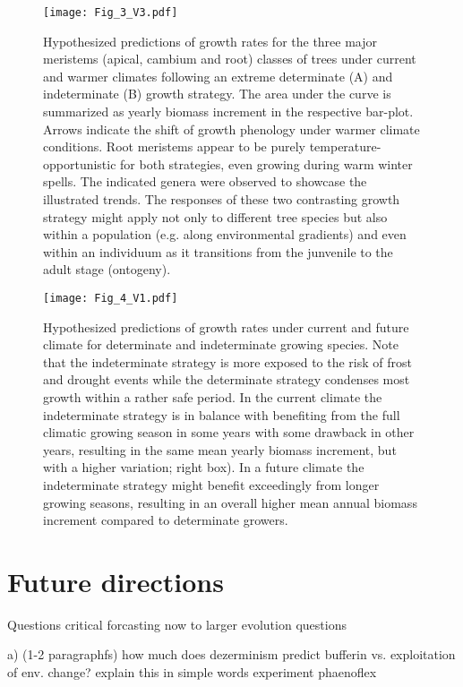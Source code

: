 \documentclass{article}
\begin{document}
								\begin{figure}
								\centering
								\texttt{[image: Fig\_3\_V3.pdf]} 
								\caption{Hypothesized predictions of growth rates for the three major meristems (apical, cambium and root) classes of trees under current and warmer climates following an extreme determinate (A) and indeterminate (B) growth strategy. The area under the curve is summarized as yearly biomass increment in the respective bar-plot. Arrows indicate the shift of growth phenology under warmer climate conditions. Root meristems appear to be purely temperature-opportunistic for both strategies, even growing during warm winter spells. The indicated genera were observed to showcase the illustrated trends. The responses of these two contrasting growth strategy might apply not only to different tree species but also within a population (e.g. along environmental gradients) and even within an individuum as it transitions from the junvenile to the adult stage (ontogeny).}
								\label{fig:fig_3xxx}
							\end{figure}
	
								\begin{figure}
								\centering
								\texttt{[image: Fig\_4\_V1.pdf]} 
								\caption{Hypothesized predictions of growth rates under current and future climate for determinate and indeterminate growing species. Note that the indeterminate strategy is more exposed to the risk of frost and drought events while the determinate strategy condenses most growth within a rather safe period. In the current climate the indeterminate strategy is in balance with benefiting from the full climatic growing season in some years with some drawback in other years, resulting in the same mean yearly biomass increment, but with a higher variation; right box). In a future climate the indeterminate strategy might benefit exceedingly from longer growing seasons, resulting in an overall higher mean annual biomass increment compared to determinate growers.}
								\label{fig:fig_4xxx}
							\end{figure}
	
\section*{Future directions}



	Questions critical forcasting now to larger evolution questions
	
	a) (1-2 paragraphfs) how much does dezerminism predict bufferin vs. exploitation of env. change?
	explain this in simple words
	experiment phaenoflex
	
\end{document}

